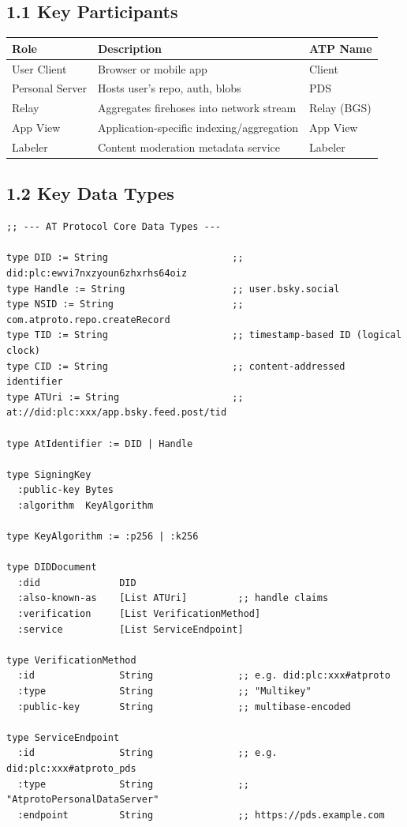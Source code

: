 \documentclass[11pt]{article}
\begin{document}
\subsection{1.1 Key Participants}
\label{sec:org5981b42}

\begin{center}
\begin{tabular}{lll}
Role & Description & ATP Name\\
\hline
User Client & Browser or mobile app & Client\\
Personal Server & Hosts user's repo, auth, blobs & PDS\\
Relay & Aggregates firehoses into network stream & Relay (BGS)\\
App View & Application-specific indexing/aggregation & App View\\
Labeler & Content moderation metadata service & Labeler\\
\end{tabular}
\end{center}
\subsection{1.2 Key Data Types}
\label{sec:orgd5c27d4}

\begin{verbatim}
;; --- AT Protocol Core Data Types ---

type DID := String                      ;; did:plc:ewvi7nxzyoun6zhxrhs64oiz
type Handle := String                   ;; user.bsky.social
type NSID := String                     ;; com.atproto.repo.createRecord
type TID := String                      ;; timestamp-based ID (logical clock)
type CID := String                      ;; content-addressed identifier
type ATUri := String                    ;; at://did:plc:xxx/app.bsky.feed.post/tid

type AtIdentifier := DID | Handle

type SigningKey
  :public-key Bytes
  :algorithm  KeyAlgorithm

type KeyAlgorithm := :p256 | :k256

type DIDDocument
  :did              DID
  :also-known-as    [List ATUri]         ;; handle claims
  :verification     [List VerificationMethod]
  :service          [List ServiceEndpoint]

type VerificationMethod
  :id               String               ;; e.g. did:plc:xxx#atproto
  :type             String               ;; "Multikey"
  :public-key       String               ;; multibase-encoded

type ServiceEndpoint
  :id               String               ;; e.g. did:plc:xxx#atproto_pds
  :type             String               ;; "AtprotoPersonalDataServer"
  :endpoint         String               ;; https://pds.example.com
\end{verbatim}
\end{document}

